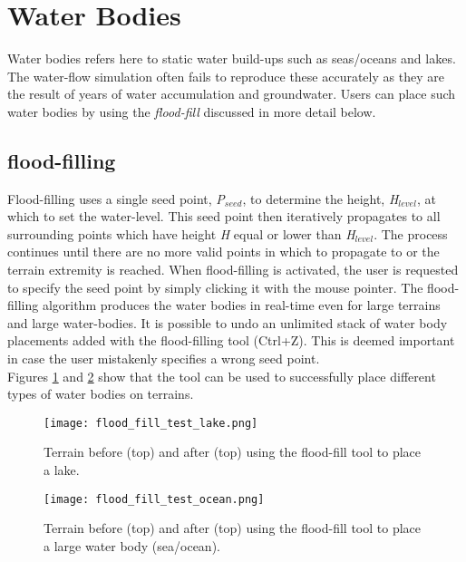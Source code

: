 \section{Water Bodies}

Water bodies refers here to static water build-ups such as seas/oceans and lakes. The water-flow simulation \label{sec:rivers_and_streams} often fails to reproduce these accurately as they are the result of years of water accumulation and groundwater. Users can place such water bodies by using the \textit{flood-fill} discussed in more detail below.

\subsection{flood-filling}

Flood-filling uses a single seed point, \textit{P$_{seed}$}, to determine the height, \textit{H$_{level}$}, at which to set the water-level. This seed point then iteratively propagates to all surrounding points which have height \textit{H} equal or lower than \textit{H$_{level}$}. The process continues until there are no more valid points in which to propagate to or the terrain extremity is reached. When flood-filling is activated, the user is requested to specify the seed point by simply clicking it with the mouse pointer. The flood-filling algorithm produces the water bodies in real-time even for large terrains and large water-bodies. It is possible to undo an unlimited stack of water body placements added with the flood-filling tool (Ctrl+Z). This is deemed important in case the user mistakenly specifies a wrong seed point. \\

Figures \ref{fig:flood_fill_lake} and \ref{fig:flood_fill_test_ocean} show that the tool can be used to successfully place different types of water bodies on terrains.

\begin{figure}
\center
	\texttt{[image: flood\_fill\_test\_lake.png]}
	\caption{ Terrain before (top) and after (top) using the flood-fill tool to place a lake. }	
	\label{fig:flood_fill_lake}
\end{figure}

\begin{figure}
\center
	\texttt{[image: flood\_fill\_test\_ocean.png]}
	\caption{ Terrain before (top) and after (top) using the flood-fill tool to place a large water body (sea/ocean). }	
	\label{fig:flood_fill_test_ocean}
\end{figure}

